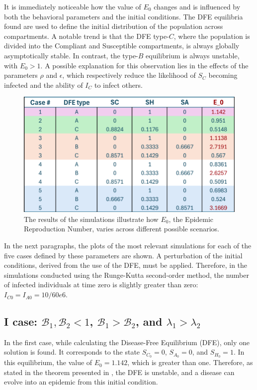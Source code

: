 It is immediately noticeable how the value of $E_0$ changes and is influenced by both the behavioral parameters and the initial conditions. The DFE equilibria found are used to define the initial distribution of the population across compartments.
A notable trend is that the DFE type-$C$, where the population is divided into the Compliant and Susceptible compartments, is always globally asymptotically stable. In contrast, the type-$B$ equilibrium is always unstable, with $E_0>1$. A possible explanation for this observation lies in the effects of the parameters $\rho$ and $\epsilon$, which respectively reduce the likelihood of $S_C$ becoming infected and the ability of $I_C$ to infect others.
\begin{figure}[h]
	\centering
	\includegraphics[width=0.6\linewidth]{"1_corpo/figure/Valori DFE e E_0_caso_3"}
	\caption[$E_0$ simulation results]{The results of the simulations illustrate how $E_0$, the Epidemic Reproduction Number, varies across different possible scenarios.}
	\label{fig:valori-dfe-e-e0caso3}
\end{figure}
In the next paragraphs, the plots of the most relevant simulations for each of the five cases defined by these parameters are shown. A perturbation of the initial conditions, derived from the use of the DFE, must be applied. Therefore, in the simulations conducted using the Runge-Kutta second-order method, the number of infected individuals at time zero is slightly greater than zero: $I_{C0}= I_{A0} = 10/60e6$.

\subsection{I case: $\mathcal{B}_1, \mathcal{B}_2 <1$, $\mathcal{B}_1 >  \mathcal{B}_2$, and $\lambda_1 > \lambda_2$}
In the first case, while calculating the Disease-Free Equilibrium (DFE), only one solution is found. It corresponds to the state $S_{C_0} = 0$, $S_{A_0} = 0$, and $S_{H_0} = 1$. In this equilibrium, the value of $E_0 = 1.142$, which is greater than one. Therefore, as stated in the theorem presented in \cite{van_den_Driessche_2017}, the DFE is unstable, and a disease can evolve into an epidemic from this initial condition.

